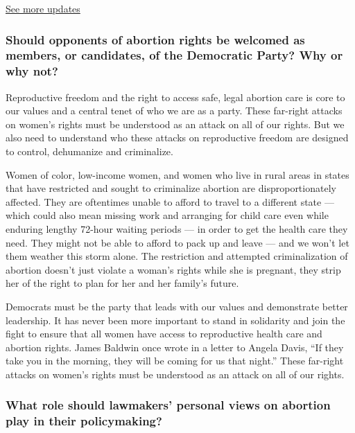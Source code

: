 \href{https://www.nytimes3xbfgragh.onion/live/2020/08/21/us/dnc-convention-election?action=click\&pgtype=Article\&state=default\&region=MAIN_CONTENT_1\&context=storylines_live_updates}{See
more updates}

\hypertarget{should-opponents-of-abortion-rights-be-welcomed-as-members-or-candidates-of-the-democratic-party-why-or-why-not-1}{%
\subsubsection{Should opponents of abortion rights be welcomed as
members, or candidates, of the Democratic Party? Why or why
not?}\label{should-opponents-of-abortion-rights-be-welcomed-as-members-or-candidates-of-the-democratic-party-why-or-why-not-1}}

Reproductive freedom and the right to access safe, legal abortion care
is core to our values and a central tenet of who we are as a party.
These far-right attacks on women's rights must be understood as an
attack on all of our rights. But we also need to understand who these
attacks on reproductive freedom are designed to control, dehumanize and
criminalize.

Women of color, low-income women, and women who live in rural areas in
states that have restricted and sought to criminalize abortion are
disproportionately affected. They are oftentimes unable to afford to
travel to a different state --- which could also mean missing work and
arranging for child care even while enduring lengthy 72-hour waiting
periods --- in order to get the health care they need. They might not be
able to afford to pack up and leave --- and we won't let them weather
this storm alone. The restriction and attempted criminalization of
abortion doesn't just violate a woman's rights while she is pregnant,
they strip her of the right to plan for her and her family's future.

Democrats must be the party that leads with our values and demonstrate
better leadership. It has never been more important to stand in
solidarity and join the fight to ensure that all women have access to
reproductive health care and abortion rights. James Baldwin once wrote
in a letter to Angela Davis, ``If they take you in the morning, they
will be coming for us that night.'' These far-right attacks on women's
rights must be understood as an attack on all of our rights.

\hypertarget{what-role-should-lawmakers-personal-views-on-abortion-play-in-their-policymaking-1}{%
\subsubsection{What role should lawmakers' personal views on abortion
play in their
policymaking?}\label{what-role-should-lawmakers-personal-views-on-abortion-play-in-their-policymaking-1}}

